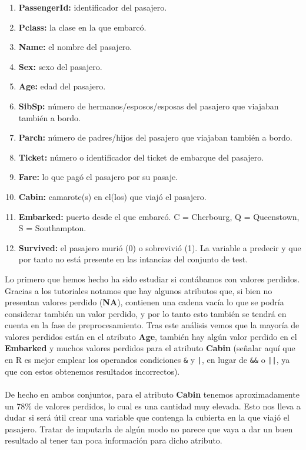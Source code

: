 \documentclass[10pt,a4paper]{article}
\begin{document}
\begin{enumerate}
\item \textbf{PassengerId: } identificador del pasajero.
\item \textbf{Pclass: } la clase en la que embarcó.
\item \textbf{Name:} el nombre del pasajero.
\item \textbf{Sex: } sexo del pasajero.
\item \textbf{Age: } edad del pasajero.
\item \textbf{SibSp: } número de hermanos/esposos/esposas del pasajero que viajaban también a bordo.
\item \textbf{Parch: } número de padres/hijos del pasajero que viajaban también a bordo.
\item \textbf{Ticket: } número o identificador del ticket de embarque del pasajero.
\item \textbf{Fare: } lo que pagó el pasajero por su pasaje.
\item \textbf{Cabin: } camarote(s) en el(los) que viajó el pasajero.
\item \textbf{Embarked: } puerto desde el que embarcó. C = Cherbourg, Q = Queenstown, S = Southampton.
\item \textbf{Survived: } el pasajero murió (0) o sobrevivió (1). La variable a predecir y que por tanto no está presente en las intancias del conjunto de test.
\end{enumerate}

Lo primero que hemos hecho ha sido estudiar si contábamos con valores perdidos. Gracias a los tutoriales notamos que hay algunos atributos que, si bien no presentan valores perdido (\textbf{NA}), contienen una cadena vacía lo que se podría considerar también un valor perdido, y por lo tanto esto también se tendrá en cuenta en la fase de preprocesamiento. Tras este análisis vemos que la mayoría de valores perdidos están en el atributo \textbf{Age}, también hay algún valor perdido en el \textbf{Embarked} y muchos valores perdidos para el atributo \textbf{Cabin} (señalar aquí que en R es mejor emplear los operandos condiciones \texttt{\&} y \texttt{|}, en lugar de \texttt{\&\&} o \texttt{||}, ya que con estos obtenemos resultados incorrectos).\\\\

De hecho en ambos conjuntos, para el atributo \textbf{Cabin} tenemos aproximadamente un 78\% de valores perdidos, lo cual es una cantidad muy elevada. Esto nos lleva a dudar si será útil crear una variable que contenga la cubierta en la que viajó el pasajero. Tratar de imputarla de algún modo no parece que vaya a dar un buen resultado al tener tan poca información para dicho atributo.\\
\end{document}
